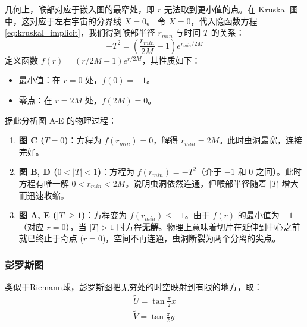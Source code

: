 \begin{derivationnote}[喉部半径的演化]
    几何上，喉部对应于嵌入图的最窄处，即 $r$ 无法取到更小值的点。在 Kruskal 图中，这对应于左右宇宙的分界线 $X=0$。
    令 $X=0$，代入隐函数方程 \eqref{eq:kruskal_implicit}，我们得到喉部半径 $r_{min}$ 与时间 $T$ 的关系：
    \begin{equation}
        -T^2 = \left(\frac{r_{min}}{2M} - 1\right) e^{r_{min}/2M}
    \end{equation}
    定义函数 $f(r) = (r/2M - 1)e^{r/2M}$，其性质如下：
    \begin{itemize}
        \item 最小值：在 $r=0$ 处，$f(0) = -1$。
        \item 零点：在 $r=2M$ 处，$f(2M) = 0$。
    \end{itemize}
    据此分析图 A-E 的物理过程：
    \begin{enumerate}
        \item \textbf{图 C ($T=0$)}：方程为 $f(r_{min}) = 0$，解得 $r_{min} = 2M$。此时虫洞最宽，连接完好。
        \item \textbf{图 B, D ($0 < |T| < 1$)}：方程为 $f(r_{min}) = -T^2$（介于 $-1$ 和 $0$ 之间）。此时方程有唯一解 $0 < r_{min} < 2M$。说明虫洞依然连通，但喉部半径随着 $|T|$ 增大而迅速收缩。
        \item \textbf{图 A, E ($|T| \geq 1$)}：方程变为 $f(r_{min}) \leq -1$。由于 $f(r)$ 的最小值为 $-1$（对应 $r=0$），当 $|T| > 1$ 时方程\textbf{无解}。物理上意味着切片在延伸到中心之前就已终止于奇点 ($r=0$)，空间不再连通，虫洞断裂为两个分离的尖点。
    \end{enumerate}
\end{derivationnote}
\subsubsection{彭罗斯图}
类似于Riemann球，彭罗斯图把无穷处的时空映射到有限的地方，取：
\begin{align}
    \widetilde{U} = \tan{\frac{\pi}{2}x} \\
    \widetilde{V} = \tan{\frac{\pi}{2}y}
\end{align}
